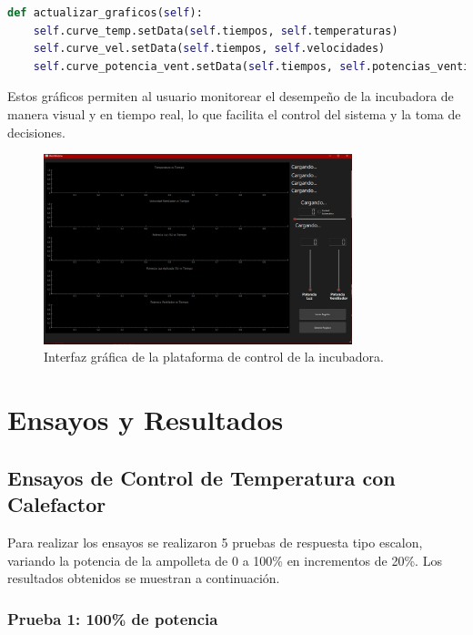 \documentclass[spanish, a4paper, 11pt]{article}
\begin{document}
\begin{lstlisting}[language=Python]
def actualizar_graficos(self):
    self.curve_temp.setData(self.tiempos, self.temperaturas)
    self.curve_vel.setData(self.tiempos, self.velocidades)
    self.curve_potencia_vent.setData(self.tiempos, self.potencias_ventilador)
\end{lstlisting}

Estos gráficos permiten al usuario monitorear el desempeño de la incubadora de manera visual y en tiempo real, lo que facilita el control del sistema y la toma de decisiones.

\begin{figure}[ht]
    \centering
    \includegraphics[width=0.8\textwidth]{./figures/Interfaz.png}
    \caption{Interfaz gráfica de la plataforma de control de la incubadora.}
\end{figure}
\FloatBarrier



\section{Ensayos y Resultados}

\subsection{Ensayos de Control de Temperatura con Calefactor}

Para realizar los ensayos se realizaron 5 pruebas de respuesta tipo escalon, variando la potencia de la ampolleta de 0 a 100\% en incrementos de 20\%. Los resultados obtenidos se muestran a continuación.

\newpage
\subsubsection{Prueba 1: 100\% de potencia}
\end{document}
